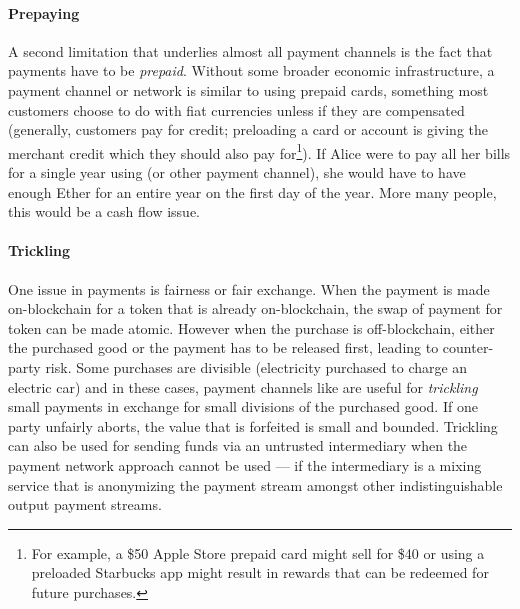 \paragraph{Prepaying} 

A second limitation that underlies almost all payment channels is the fact that payments have to be \textit{prepaid}. Without some broader economic infrastructure, a payment channel or network is similar to using prepaid cards, something most customers choose to do with fiat currencies unless if they are  compensated (generally, customers pay for credit; preloading a card or account is giving the merchant credit which they should also pay for\footnote{For example, a \$50 Apple Store prepaid card might sell for \$40 or using a preloaded Starbucks app might result in rewards that can be redeemed for future purchases.}). If Alice were to pay all her bills for a single year using \ew (or other payment channel), she would have to have enough Ether for an entire year on the first day of the year. More many people, this would be a cash flow issue. 

\paragraph{Trickling} 

One issue in payments is fairness or fair exchange. When the payment is made on-blockchain for a token that is already on-blockchain, the swap of payment for token can be made atomic. However when the purchase is off-blockchain, either the purchased good or the payment has to be released first, leading to counter-party risk. Some purchases are divisible (\eg electricity purchased to charge an electric car) and in these cases, payment channels like \ew are useful for \textit{trickling} small payments in exchange for small divisions of the purchased good. If one party unfairly aborts, the value that is forfeited is small and bounded. Trickling can also be used for sending funds via an untrusted intermediary when the payment network approach cannot be used --- \eg if the intermediary is a mixing service that is anonymizing the payment stream amongst other indistinguishable output payment streams.


